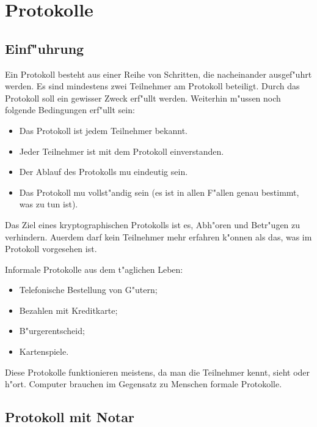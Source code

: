 \chapter{Protokolle}

\section{Einf"uhrung}

Ein Protokoll besteht aus einer Reihe von Schritten, die nacheinander
ausgef"uhrt werden. Es sind mindestens zwei Teilnehmer am Protokoll
beteiligt. Durch das Protokoll soll ein gewisser Zweck erf"ullt
werden. Weiterhin m"ussen noch folgende Bedingungen erf"ullt sein:

\begin{itemize}
  \item Das Protokoll ist jedem Teilnehmer bekannt.
  \item Jeder Teilnehmer ist mit dem Protokoll einverstanden. 
  \item Der Ablauf des Protokolls mu\3 eindeutig sein.
  \item Das Protokoll mu\3 vollst"andig sein (es ist in allen 
        F"allen genau bestimmt, was zu tun ist).
\end{itemize}

Das Ziel eines kryptographischen Protokolls ist es, Abh"oren und
Betr"ugen zu verhindern. Au\3erdem darf kein Teilnehmer mehr erfahren
k"onnen als das, was im Protokoll vorgesehen ist.

\begin{beispiel} Informale Protokolle aus dem t"aglichen Leben:
  \begin{itemize}
    \item Telefonische Bestellung von G"utern;
    \item Bezahlen mit Kreditkarte;
    \item B"urgerentscheid;
    \item Kartenspiele.
  \end{itemize}
\end{beispiel}

Diese Protokolle funktionieren meistens, da man die Teilnehmer kennt,
sieht oder h"ort. Computer brauchen im Gegensatz zu Menschen formale
Protokolle.

\section{Protokoll mit Notar}

